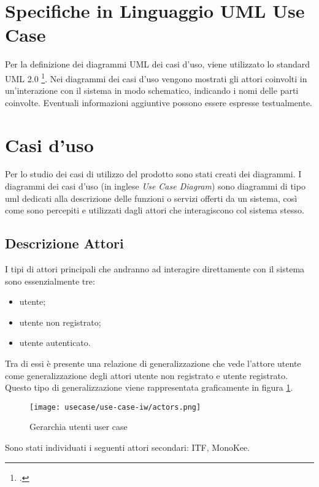 \section{Specifiche in Linguaggio UML Use Case}
Per la definizione dei diagrammi UML dei casi d’uso, viene utilizzato lo standard UML 2.0 \footcite{site:uml}. Nei diagrammi dei casi d’uso vengono mostrati gli attori coinvolti in un’interazione con il sistema in modo schematico, indicando i nomi delle parti coinvolte. Eventuali informazioni aggiuntive possono essere espresse testualmente.


\section{Casi d'uso}

Per lo studio dei casi di utilizzo del prodotto sono stati creati dei diagrammi.
I diagrammi dei casi d'uso (in inglese \emph{Use Case Diagram}) sono diagrammi di tipo \gls{uml} dedicati alla descrizione delle funzioni o servizi offerti da un sistema, così come sono percepiti e utilizzati dagli attori che interagiscono col sistema stesso.

\subsection{Descrizione Attori}
I tipi di attori principali che andranno ad interagire direttamente con il sistema sono essenzialmente tre: 
\begin{itemize}
    \item utente;
    \item utente non registrato;
    \item utente autenticato. 
\end{itemize}   
Tra di essi è presente una relazione di generalizzazione che vede l’attore utente come generalizzazione degli attori utente non registrato e utente registrato. Questo tipo di generalizzazione viene rappresentata graficamente in figura \ref{fig:ger-actors}.
\begin{figure}[!h]
    
    \centering
    \texttt{[image: usecase/use-case-iw/actors.png]} 
    \caption{Gerarchia utenti user case}
    \label{fig:ger-actors} 
\end{figure}
Sono stati individuati i seguenti attori secondari: ITF, MonoKee.
